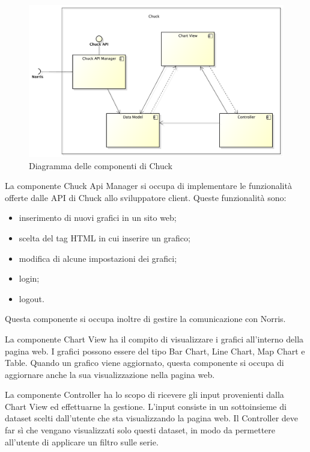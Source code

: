 	\begin{figure}[H]\centering
        \includegraphics[width=\textwidth]{SpecificaTecnica/Pics/ComponentiChuck}
        \caption{Diagramma delle componenti di Chuck}
    \end{figure}
		La componente Chuck Api Manager si occupa di implementare le funzionalità offerte dalle API di Chuck allo sviluppatore client. Queste funzionalità sono:
		\begin{itemize}
			\item inserimento di nuovi grafici in un sito web;
			\item scelta del tag HTML in cui inserire un grafico;
			\item modifica di alcune impostazioni dei grafici;
			\item login;
			\item logout.
		\end{itemize}
		Questa componente si occupa inoltre di gestire la comunicazione con Norris.
		
		La componente Chart View ha il compito di visualizzare i grafici all'interno della pagina web. I grafici possono essere del tipo Bar Chart, Line Chart, Map Chart e Table. Quando un grafico viene aggiornato, questa componente si occupa di aggiornare anche la sua visualizzazione nella pagina web.

		La componente Controller ha lo scopo di ricevere gli input provenienti dalla Chart View ed effettuarne la gestione. L'input consiste in un sottoinsieme di dataset scelti dall'utente che sta visualizzando la pagina web. Il Controller deve far sì che vengano visualizzati solo questi dataset, in modo da permettere all'utente di applicare un filtro sulle serie.

